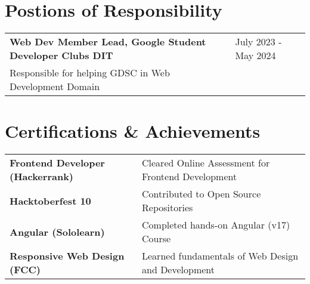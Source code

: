 \documentclass[a4paper,10pt]{article}
\begin{document}
\section{Postions of Responsibility}

\begin{tabularx}{\linewidth}{@{}l X@{}}	

\textbf{Web Dev Member Lead, Google Student Developer Clubs DIT} & \hfill 
July 2023 - May 2024  \\ \vspace*{1mm}
Responsible for helping GDSC in Web Development Domain \\ 

\end{tabularx}

\section{Certifications \& Achievements}




\begin{tabularx}{\linewidth}{@{}l X@{}}
\textbf{Frontend Developer (Hackerrank)} &  \normalsize{Cleared Online Assessment for Frontend Development}\\
\textbf{Hacktoberfest 10}  &  \normalsize{Contributed to Open Source Repositories }\\
\textbf{Angular (Sololearn)} &  \normalsize{Completed hands-on Angular (v17) Course}\\
\textbf{Responsive Web Design (FCC)}  &  \normalsize{Learned fundamentals of Web Design and Development}\\
\end{tabularx}

\end{document}

